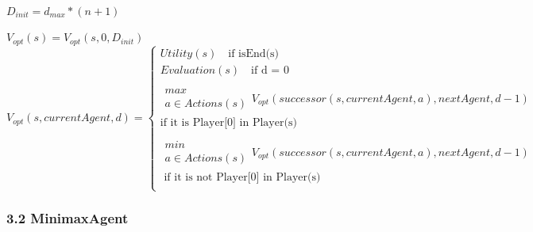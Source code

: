 \documentclass[12pt]{article}
\begin{document}
		\paragraph{}
		\paragraph{}
$D_{init} = d_{max} * (n+1) $

$V_{opt}(s) = V_{opt}(s, 0, D_{init})$
\[ V_{opt}(s, currentAgent, d) = 
\begin{cases} 
Utility(s)   \quad \text{if isEnd(s)}\\
Evaluation(s) \quad \text{if d = 0}  \\ \\
\substack{max \\a \in Actions(s)} V_{opt}(successor(s, currentAgent, a), nextAgent, d - 1 ) \\ \text{if it is Player[0] in Player(s)} \\ \\
\substack{min \\a \in Actions(s)} V_{opt}(successor(s,currentAgent, a), nextAgent, d - 1) \\ \text{ if it is not Player[0] in Player(s)} \\
\end{cases}
\]

\subsubsection{3.2 MinimaxAgent}
\end{document}
